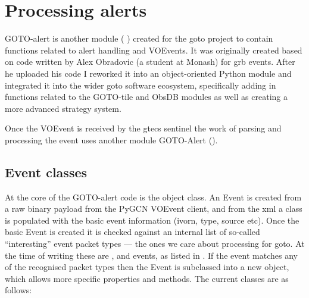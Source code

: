 
\newpage
\section{Processing alerts}
\label{sec:gotoalert}
\begin{colsection}


\begin{colsection}


GOTO-alert is another  module ( ) created for the \gls{goto} project to contain functions related to alert handling and VOEvents. It was originally created based on code written by Alex Obradovic (a student at Monash) for \gls{grb} events. After he uploaded his code I reworked it into an object-oriented Python module and integrated it into the wider \gls{goto} software ecosystem, specifically adding in functions related to the GOTO-tile and ObsDB modules as well as creating a more advanced strategy system.

Once the VOEvent is received by the \gls{gtecs} sentinel the work of parsing and processing the event uses another  module GOTO-Alert ().

\end{colsection}


\subsection{Event classes}
\label{sec:event_classes}
\begin{colsection}

At the core of the GOTO-alert code is the  object class. An Event is created from a raw binary payload from the PyGCN VOEvent client, and from the \gls{xml} a  class is populated with the basic event information (\gls{ivorn}, type, source etc). Once the basic Event is created it is checked against an internal list of so-called ``interesting'' event packet types --- the ones we care about processing for \gls{goto}. At the time of writing these are ,  and  events, as listed in . If the event matches any of the recognised packet types then the Event is subclassed into a new object, which allows more specific properties and methods. The current classes are as follows:


\end{colsection}
\end{colsection}
